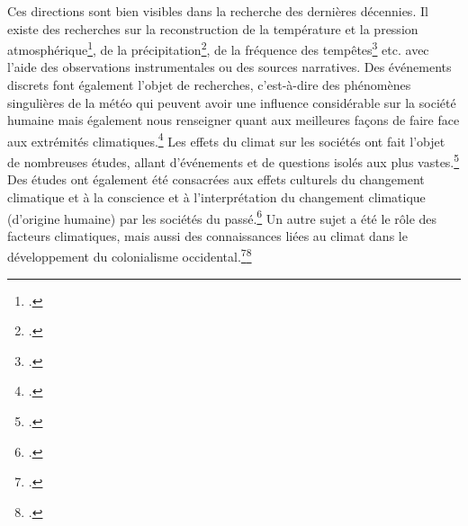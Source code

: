 \documentclass[a4paper,twoside,12pt]{article}
\begin{document}
Ces directions sont bien visibles dans la recherche des dernières décennies. Il existe des recherches sur la reconstruction de la température et la pression atmosphérique\footcites{jones_monthly_1999}{bergstrom_daily_2002}{moberg_daily_2002}, de la précipitation\footcites{fenby_rainfall_2013}, de la fréquence des tempêtes\footcites{jones_preliminary_2005}{barring_scandinavian_2004}{wheeler_atmospheric_2010}{von_storch_storm_2008} etc. avec l'aide des observations instrumentales ou des sources narratives. Des événements discrets font également l'objet de recherches, c'est-à-dire des phénomènes singulières de la météo qui peuvent avoir une influence considérable sur la société humaine mais également nous renseigner quant aux meilleures façons de faire face aux extrémités climatiques.\footcites{fredriksson_using_2018}{wheeler_great_2003}{garnier_historical_2018}{brazdil_chronology_2000}{pfister_meteorological_2010} Les effets du climat sur les sociétés ont fait l'objet de nombreuses études, allant d'événements et de questions isolés aux plus vastes.\footcite[Par exemple, Geoffrey Parker a comparé différentes sociétés à travers le monde au XVII\textsuperscript{e} siècle et a conclu que toutes les grandes civilisations connaissaient des difficultés similaires à la même époque. Selon lui, la baisse des températures et les phénomènes météorologiques extrêmes qui l'accompagnent sont la cause principale de ces évolutions, le temps frais entraînant de mauvaises récoltes dans les sociétés développées qui étaient alors proches de la saturation démographique.][]{parker_global_2013} Des études ont également été consacrées aux effets culturels du changement climatique et à la conscience et à l'interprétation du changement climatique (d'origine humaine) par les sociétés du passé.\footcites{bristow_cultural_2016}{fressoz_lagir_2015}{fressoz_les_2020}{heymann_evolution_2010} Un autre sujet a été le rôle des facteurs climatiques, mais aussi des connaissances liées au climat dans le développement du colonialisme occidental.\footcite{mahony_climate_2018}\footcites[Pour un aperçu exhaustif de l'historiographie dans tous ces sous-domaines, voir][]{ljungqvist_climate_2021}{carey_climate_2012}


\end{document}
